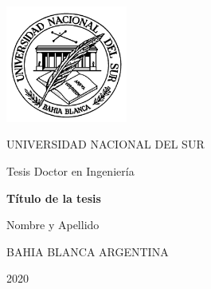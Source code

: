 \thispagestyle{empty}

\begin{center}\leavevmode
    \includegraphics[width=4cm]{img/LogoUns.png}
    
    \vspace{.5cm}
    
    {\LARGE \sc UNIVERSIDAD NACIONAL DEL SUR}
    
    \vspace{3.0cm}
    
    {\LARGE Tesis Doctor en Ingeniería}
    
    \vspace{2cm}
    
    \begin{Large}
    	\textbf{Título de la tesis}
    \end{Large}
    
    \vspace{2cm}
    
    {\LARGE Nombre y Apellido}
    
    \vfill
    
    {\large \vspace{.2cm} BAHIA BLANCA \hspace{4cm} ARGENTINA}
    
    \vspace{1cm}
    
    {\large \vspace{.2cm} 2020}

\end{center}
